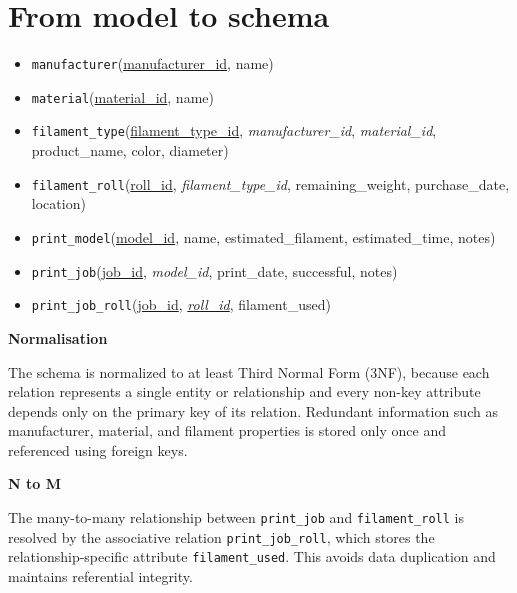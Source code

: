 \documentclass[11pt,a4paper]{article}
\begin{document}
\section{From model to schema}

\begin{itemize}
  \item \texttt{manufacturer}(\underline{manufacturer\_id}, name)
  
  \item \texttt{material}(\underline{material\_id}, name)
  
  \item \texttt{filament\_type}(\underline{filament\_type\_id}, 
  \emph{manufacturer\_id}, \emph{material\_id}, product\_name, color, diameter)
  
  \item \texttt{filament\_roll}(\underline{roll\_id}, 
  \emph{filament\_type\_id}, remaining\_weight, purchase\_date, location)
  
  \item \texttt{print\_model}(\underline{model\_id}, 
  name, estimated\_filament, estimated\_time, notes)
  
  \item \texttt{print\_job}(\underline{job\_id}, 
  \emph{model\_id}, print\_date, successful, notes)
  
  \item \texttt{print\_job\_roll}(\underline{job\_id}, 
  \underline{\emph{roll\_id}}, filament\_used)
\end{itemize}

\textbf{Normalisation}

The schema is normalized to at least Third Normal Form (3NF), because each
relation represents a single entity or relationship and every non-key attribute
depends only on the primary key of its relation. Redundant information such as
manufacturer, material, and filament properties is stored only once and
referenced using foreign keys.

\textbf{N to M}

The many-to-many relationship between \texttt{print\_job} and
\texttt{filament\_roll} is resolved by the associative relation
\texttt{print\_job\_roll}, which stores the relationship-specific attribute
\texttt{filament\_used}. This avoids data duplication and maintains referential
integrity.

\clearpage
\end{document}
